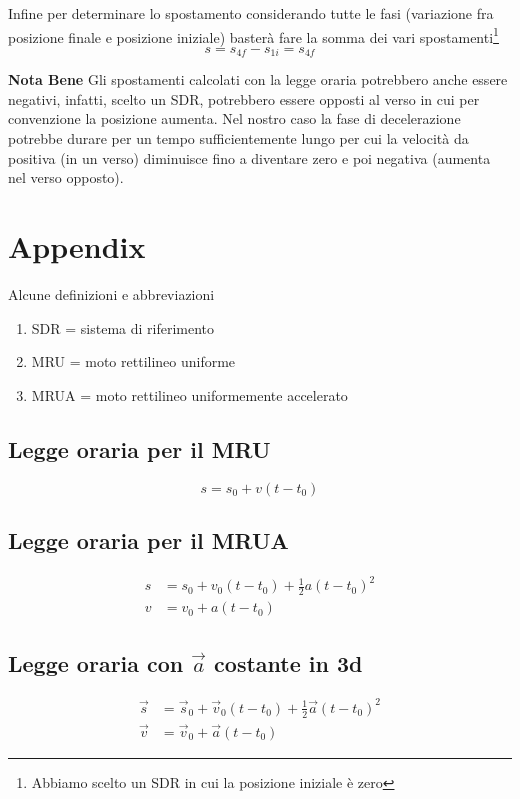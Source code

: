 \documentclass{article}
\begin{document}
Infine per determinare lo spostamento considerando tutte le fasi (variazione fra posizione finale e posizione iniziale) basterà fare la somma dei vari spostamenti\footnote{Abbiamo scelto un SDR in cui la posizione iniziale è zero}
\begin{equation}
  s = s_{4f} - s_{1i} = s_{4f}
\end{equation}

\textbf{Nota Bene} Gli spostamenti calcolati con la legge oraria potrebbero anche essere negativi, infatti, scelto un SDR, potrebbero essere opposti al verso in cui per convenzione la posizione aumenta. Nel nostro caso la fase di decelerazione potrebbe durare per un tempo sufficientemente lungo per cui la velocità da positiva (in un verso) diminuisce fino a diventare zero e poi negativa (aumenta nel verso opposto).


\newpage
\section*{Appendix}

Alcune definizioni e abbreviazioni
\begin{enumerate}
  \item SDR = sistema di riferimento
  \item MRU = moto rettilineo uniforme
  \item MRUA = moto rettilineo uniformemente accelerato
\end{enumerate}

\subsection*{Legge oraria per il MRU}
\begin{equation}
  s = s_0 + v (t-t_0)
\end{equation}

\subsection*{Legge oraria per il MRUA}
\begin{align}
  s &= s_0 + v_0 (t-t_0) + \frac{1}{2} a (t-t_0)^2 \\
  v &= v_0 + a (t-t_0)
\end{align}

\subsection*{Legge oraria con $\Vec{a}$ costante in 3d}
\begin{align}
  \Vec{s} &= \Vec{s}_0 + \Vec{v}_0 (t-t_0) + \frac{1}{2} \Vec{a} (t-t_0)^2 \\
  \Vec{v} &= \Vec{v}_0 + \Vec{a} (t-t_0)
\end{align}
\end{document}
